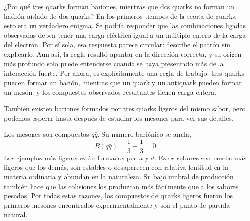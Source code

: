 \begin{classroomqa}
\end{classroomqa}

\begin{classroomqa}
\end{classroomqa}

¿Por qué tres quarks forman bariones, mientras que dos quarks no forman un hadrón aislado de dos quarks? En los primeros tiempos de la teoría de quarks, esto era un verdadero enigma. Se podría responder que las combinaciones ligadas observadas deben tener una carga eléctrica igual a un múltiplo entero de la carga del electrón. Por sí sola, esa respuesta parece circular: describe el patrón sin explicarlo. Aun así, la regla resultó apuntar en la dirección correcta, y su origen más profundo solo puede entenderse cuando se haya presentado más de la interacción fuerte. Por ahora, es explícitamente una regla de trabajo: tres quarks pueden formar un barión, mientras que un quark y un antiquark pueden formar un mesón, y los compuestos observados resultantes tienen carga entera.

También existen bariones formados por tres quarks ligeros del mismo sabor, pero podemos esperar hasta después de estudiar los mesones para ver sus detalles.

Los mesones son compuestos \(q\bar q\). Su número bariónico se anula,
\begin{equation}
B(q\bar q)=\frac13-\frac13=0.
\end{equation}
Los ejemplos más ligeros están formados por \(u\) y \(d\). Estos sabores son mucho más ligeros que los demás, son estables o desaparecen con relativa lentitud en la materia ordinaria y abundan en la naturaleza. Su bajo umbral de producción también hace que las colisiones los produzcan más fácilmente que a los sabores pesados. Por todas estas razones, los compuestos de quarks ligeros fueron los primeros mesones encontrados experimentalmente y son el punto de partida natural.

